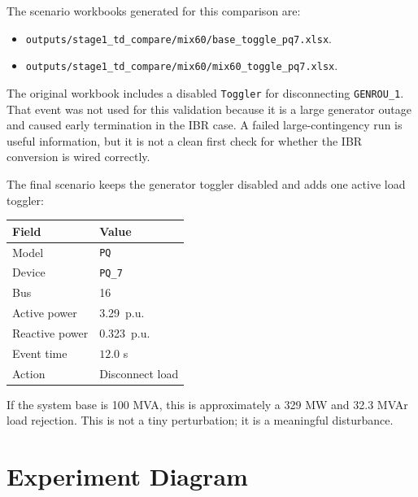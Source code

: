 \documentclass[11pt,letterpaper]{article}
\begin{document}
The scenario workbooks generated for this comparison are:

\begin{itemize}
  \item \texttt{outputs/stage1\_td\_compare/mix60/base\_toggle\_pq7.xlsx}.
  \item \texttt{outputs/stage1\_td\_compare/mix60/mix60\_toggle\_pq7.xlsx}.
\end{itemize}

The original workbook includes a disabled \texttt{Toggler} for disconnecting
\texttt{GENROU\_1}. That event was not used for this validation because it is a
large generator outage and caused early termination in the IBR case. A failed
large-contingency run is useful information, but it is not a clean first check
for whether the IBR conversion is wired correctly.

The final scenario keeps the generator toggler disabled and adds one active
load toggler:

\begin{center}
\begin{tabular}{ll}
\toprule
Field & Value \\
\midrule
Model & \texttt{PQ} \\
Device & \texttt{PQ\_7} \\
Bus & 16 \\
Active power & 3.29~p.u. \\
Reactive power & 0.323~p.u. \\
Event time & \(12.0\) s \\
Action & Disconnect load \\
\bottomrule
\end{tabular}
\end{center}

If the system base is 100 MVA, this is approximately a 329 MW and 32.3 MVAr
load rejection. This is not a tiny perturbation; it is a meaningful disturbance.

\section{Experiment Diagram}
\end{document}
